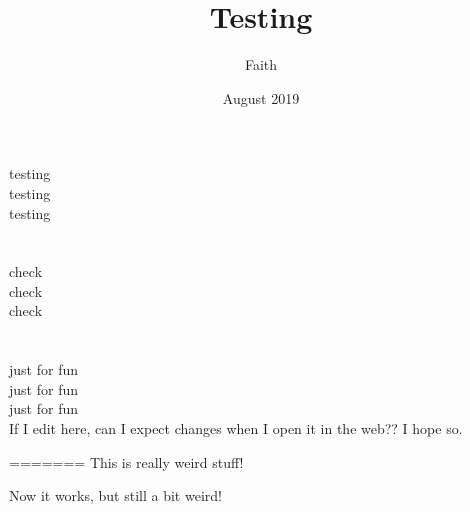 \documentclass{article}
\title{Testing}
\date{August 2019}
\author{Faith}
\begin{document}
\maketitle
testing \\
testing\\
testing\\
\\
\\
check\\
check\\
check\\
\\
\\
just for fun
\\
just for fun
\\
just for fun
\\

If I edit here, can I expect changes when I open it in the web?? I hope so.


=======
This is really weird stuff!


Now it works, but still a bit weird!
\end{document}
